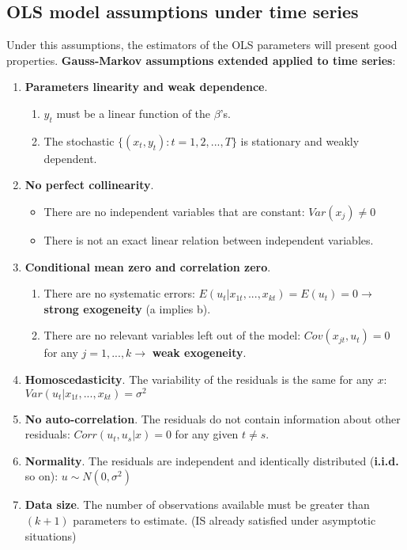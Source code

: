 \documentclass[10pt, a4paper, landscape]{extarticle}
\begin{document}
\begin{multicols}{3}
	\subsection*{OLS model assumptions under time series}
		Under this assumptions, the estimators of the OLS parameters will present good properties. \textbf{Gauss-Markov assumptions extended applied to time series}:
		\begin{enumerate}[leftmargin=*, label=ts\arabic*.]
			\item \textbf{Parameters linearity and weak dependence}.
			\begin{enumerate}[leftmargin=*, label=\alph*.]
				\item $y_t$ must be a linear function of the $\beta$'s.
				\item The stochastic $\lbrace(x_t, y_t): t = 1, 2, ..., T\rbrace$ is stationary and weakly dependent.
			\end{enumerate} 
			\item \textbf{No perfect collinearity}.
			\begin{itemize}[leftmargin=*]
				\item There are no independent variables that are constant: $Var(x_j) \neq 0$
				\item There is not an exact linear relation between independent variables.
			\end{itemize}
			\item \textbf{Conditional mean zero and correlation zero}.
			\begin{enumerate}[leftmargin=*, label=\alph*.]
				\item There are no systematic errors: $E(u_t | x_{1t}, ..., x_{kt}) = E(u_t) = 0 \rightarrow$ \textbf{strong exogeneity} (a implies b).
				\item There are no relevant variables left out of the model: $Cov(x_{jt} , u_t) = 0$ for any $j = 1, ..., k \rightarrow$ \textbf{weak exogeneity}.
			\end{enumerate}
			\item \textbf{Homoscedasticity}. The variability of the residuals is the same for any $x$: $Var(u_t | x_{1t}, ..., x_{kt}) = \sigma^2$
			\item \textbf{No auto-correlation}. The residuals do not contain information about other residuals: $Corr(u_t, u_s | x) = 0$ for any given $t \neq s$.
			\item \textbf{Normality}. The residuals are independent and identically distributed (\textbf{i.i.d.} so on): $u \sim N(0,\sigma^2)$
			\item \textbf{Data size}. The number of observations available must be greater than $(k + 1)$ parameters to estimate. (IS already satisfied under asymptotic situations)
		\end{enumerate}	

\end{multicols}
\end{document}
